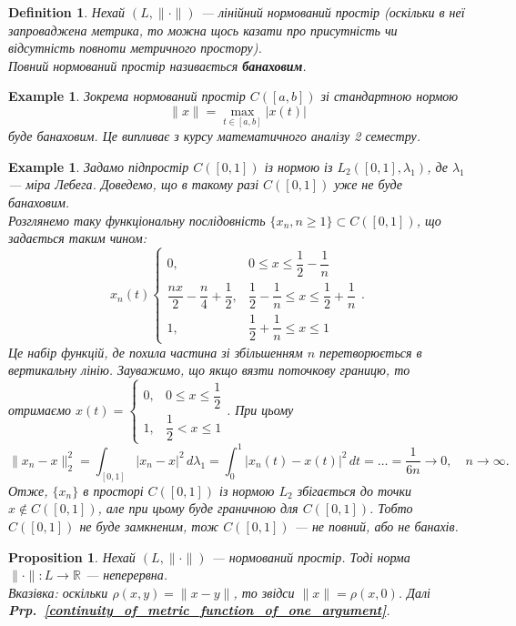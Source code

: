 \documentclass[a4paper, 10pt]{article}
\theoremstyle{theoremdd}
\theoremstyle{theoremdd}
\newtheorem{definition}[theorem]{Definition}
\theoremstyle{theoremdd}
\theoremstyle{theoremdd}
\newtheorem{example}[theorem]{Example}
\theoremstyle{theoremdd}
\newtheorem{proposition}[theorem]{Proposition}
\theoremstyle{theoremdd}
\theoremstyle{theoremdd}
\theoremstyle{theoremdd}
\newcommand\prpref[1]{\textbf{Prp.~\ref{#1}}}
\begin{document}
\begin{definition}
Нехай $(L, \|\cdot\|)$ --- лінійний нормований простір (\textit{оскільки в неї запроваджена метрика, то можна щось казати про присутність чи відсутність повноти метричного простору}).\\
Повний нормований простір називається \textbf{банаховим}.
\end{definition}

\begin{example}
Зокрема нормований простір $C([a,b])$ зі стандартною нормою
\[
\|x\| = \max_{t \in [a,b]} |x(t)|
\]
буде банаховим. Це випливає з курсу математичного аналізу 2 семестру.
\end{example}

\begin{example}
Задамо підпростір $C([0,1])$ із нормою із $L_2([0,1],\lambda_1)$, де $\lambda_1$ --- міра Лебега. Доведемо, що в такому разі $C([0,1])$ уже не буде банаховим.\\
Розглянемо таку функціональну послідовність $\{x_n,n \geq 1\} \subset C([0,1])$, що задається таким чином:
\[
x_n(t) \begin{cases}
0, & 0 \leq x \leq \dfrac{1}{2} - \dfrac{1}{n} \\
\dfrac{nx}{2} - \dfrac{n}{4} + \dfrac{1}{2}, & \dfrac{1}{2} - \dfrac{1}{n} \leq x \leq \dfrac{1}{2} + \dfrac{1}{n} \\
1, & \dfrac{1}{2} + \dfrac{1}{n} \leq x \leq 1
\end{cases}.
\]
Це набір функцій, де похила частина зі збільшенням $n$ перетворюється в вертикальну лінію. Зауважимо, що якщо вязти поточкову границю, то отримаємо $x(t) = \begin{cases} 0, & 0 \leq x \leq \dfrac{1}{2} \\1, & \dfrac{1}{2} < x \leq 1 \end{cases}$. При цьому
\[
\|x_n - x\|_2^2 = \displaystyle\int_{[0,1]} |x_n-x|^2\,d\lambda_1 = \int_0^1 |x_n(t)-x(t)|^2\,dt = \dots = \dfrac{1}{6n} \to 0,\quad n \to \infty.
\]
Отже, $\{x_n\}$ в просторі $C([0,1])$ із нормою $L_2$ збігається до точки $x \notin C([0,1])$, але при цьому буде граничною для $C([0,1])$. Тобто $C([0,1])$ не буде замкненим, тож $C([0,1])$ --- не повний, або не банахів.
\end{example}

\begin{proposition}
Нехай $(L, \|\cdot \|)$ --- нормований простір. Тоді норма $\| \cdot \| \colon L \to \mathbb{R}$ --- неперервна.\\
\textit{Вказівка: оскільки $\rho(x,y) = \|x-y\|$, то звідси $\|x\| = \rho(x,0)$. Далі \prpref{continuity_of_metric_function_of_one_argument}.}
\end{proposition}
\end{document}
